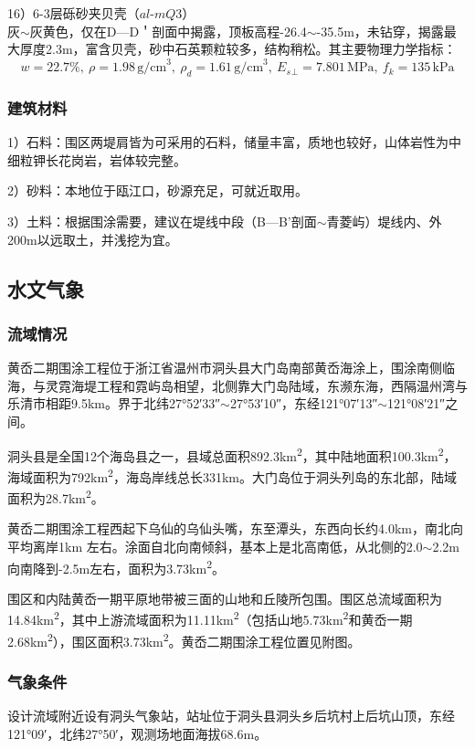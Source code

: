 \documentclass[UTF8, a4paper, 12pt]{ctexart} %
\begin{document}
\par 16）6-3层砾砂夹贝壳（$al$-$mQ3$）\\
灰$\sim$灰黄色，仅在D—D＇剖面中揭露，顶板高程-26.4$\sim$-35.5m，未钻穿，揭露最大厚度2.3m，富含贝壳，砂中石英颗粒较多，结构稍松。其主要物理力学指标：
\[
w=22.7\%,\ \rho=1.98\, \text{g/cm}^3,\ \rho_d=1.61\, \text{g/cm}^3,\ E_s{_\perp}=7.801\, \text{MPa},\ f_k=135\, \text{kPa}
\]

\subsubsection{建筑材料}
\par 1）石料：围区两堤肩皆为可采用的石料，储量丰富，质地也较好，山体岩性为中细粒钾长花岗岩，岩体较完整。
\par 2）砂料：本地位于瓯江口，砂源充足，可就近取用。
\par 3）土料：根据围涂需要，建议在堤线中段（B—B’剖面$\sim$青菱屿）堤线内、外200m以远取土，并浅挖为宜。


\subsection{水文气象}
\subsubsection{流域情况}
黄岙二期围涂工程位于浙江省温州市洞头县大门岛南部黄岙海涂上，围涂南侧临海，与灵霓海堤工程和霓屿岛相望，北侧靠大门岛陆域，东濒东海，西隔温州湾与乐清市相距9.5km。界于北纬27°52′33″$\sim$27°53′10″，东经121°07′13″$\sim$121°08′21″之间。

洞头县是全国12个海岛县之一，县域总面积892.3km\textsuperscript{2}，其中陆地面积100.3km\textsuperscript{2}，海域面积为792km\textsuperscript{2}，海岛岸线总长331km。大门岛位于洞头列岛的东北部，陆域面积为28.7km\textsuperscript{2}。

黄岙二期围涂工程西起下乌仙的乌仙头嘴，东至潭头，东西向长约4.0km，南北向平均离岸1km 左右。涂面自北向南倾斜，基本上是北高南低，从北侧的2.0$\sim$2.2m 向南降到-2.5m左右，面积为3.73km\textsuperscript{2}。

围区和内陆黄岙一期平原地带被三面的山地和丘陵所包围。围区总流域面积为14.84km\textsuperscript{2}，其中上游流域面积为11.11km\textsuperscript{2}（包括山地5.73km\textsuperscript{2}和黄岙一期2.68km\textsuperscript{2}），围区面积3.73km\textsuperscript{2}。黄岙二期围涂工程位置见附图。



\subsubsection{气象条件}
设计流域附近设有洞头气象站，站址位于洞头县洞头乡后坑村上后坑山顶，东经121°09′，北纬27°50′，观测场地面海拔68.6m。
\end{document}
